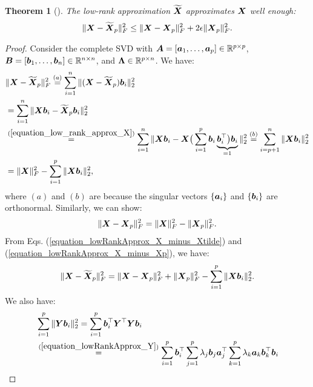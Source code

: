 \documentclass{article}
\newtheorem{theorem}{Theorem}
\def\b{\ensuremath\boldsymbol}
\begin{document}
\begin{theorem}[{\citep[Theorem 5]{papadimitriou2000latent}}]
The low-rank approximation $\widetilde{\b{X}}$ approximates $\b{X}$ well enough:
\begin{align}
\|\b{X} - \widetilde{\b{X}}_p\|_F^2 \leq \|\b{X} - \b{X}_p\|_F^2 + 2 \epsilon \|\b{X}_p\|_F^2.
\end{align}
\end{theorem}
\begin{proof}
Consider the complete SVD with $\b{A} = [\b{a}_1, \dots, \b{a}_p] \in \mathbb{R}^{p \times p}$, $\b{B} = [\b{b}_1, \dots, \b{b}_{n}] \in \mathbb{R}^{n \times n}$, and $\b{\Lambda} \in \mathbb{R}^{p \times n}$.
We have:
\begin{align}
&\|\b{X} - \widetilde{\b{X}}_p\|_F^2 \overset{(a)}{=} \sum_{i=1}^{n} \|(\b{X} - \widetilde{\b{X}}_p) \b{b}_i\|_2^2 \nonumber\\
&= \sum_{i=1}^{n} \|\b{X} \b{b}_i - \widetilde{\b{X}}_p \b{b}_i \|_2^2 
\nonumber\\
&\overset{(\ref{equation_low_rank_approx_X})}{=} \sum_{i=1}^{n} \|\b{X} \b{b}_i - \b{X} \big(\sum_{i=1}^p \b{b}_i \underbrace{\b{b}_i^\top\big) \b{b}_i}_{=1}\|_2^2 \overset{(b)}{=} \sum_{i=p+1}^{n} \|\b{X} \b{b}_i\|_2^2 \nonumber\\
&= \|\b{X}\|_F^2 - \sum_{i=1}^p \|\b{X} \b{b}_i\|_2^2, \label{equation_lowRankApprox_X_minus_Xtilde}
\end{align}
where $(a)$ and $(b)$ are because the singular vectors $\{\b{a}_i\}$ and $\{\b{b}_i\}$ are orthonormal. 
Similarly, we can show:
\begin{align}
\|\b{X} - \b{X}_p\|_F^2 = \|\b{X}\|_F^2 - \|\b{X}_p\|_F^2. \label{equation_lowRankApprox_X_minus_Xp}
\end{align}
From Eqs. (\ref{equation_lowRankApprox_X_minus_Xtilde}) and (\ref{equation_lowRankApprox_X_minus_Xp}), we have:
\begin{align}\label{equation_lowRankApprox_X_minus_Xp_tilde_equals_sth}
\|\b{X} - \widetilde{\b{X}}_p\|_F^2 = \|\b{X} - \b{X}_p\|_F^2 + \|\b{X}_p\|_F^2 - \sum_{i=1}^p \|\b{X} \b{b}_i\|_2^2.
\end{align}
We also have:
\begin{align}
&\sum_{i=1}^p \|\b{Y} \b{b}_i\|_2^2 = \sum_{i=1}^p \b{b}_i^\top \b{Y}^\top \b{Y} \b{b}_i \nonumber\\
&\overset{(\ref{equation_lowRankApprox_Y})}{=} \sum_{i=1}^p \b{b}_i^\top \sum_{j=1}^p \lambda_j \b{b}_j \b{a}_j^\top \sum_{k=1}^p \lambda_k \b{a}_k \b{b}_k^\top \b{b}_i \nonumber\\

\end{align}
\end{proof}
\end{document}
